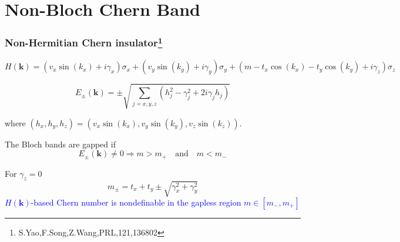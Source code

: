 \documentclass{beamer}
\begin{document}
\section{Non-Bloch Chern Band}
\begin{frame}
\frametitle{Non-Hermitian Chern insulator\footnote{S.Yao,F.Song,Z.Wang,PRL,121,136802}}
\begin{footnotesize}
\begin{equation}
H(\mathbf{k})=(v_x\sin(k_x)+i\gamma_x)\sigma_x+(v_y\sin(k_y)+i\gamma_y)\sigma_y+(m-t_x\cos(k_x)-t_y\cos(k_y)+i\gamma_z)\sigma_z
\end{equation}
\end{footnotesize}

\begin{footnotesize}
\begin{equation}
E_{\pm}(\mathbf{k})=\pm\sqrt{\sum_{j=x,y,z}(h_j^2-\gamma_j^2+2i\gamma_jh_j)}
\end{equation}
\end{footnotesize}
where $(h_x,h_y,h_z)=(v_x\sin(k_x),v_y\sin(k_y),v_z\sin(k_z))$.

The Bloch bands are gapped if $$E_{\pm}(\mathbf{k})\neq 0\Rightarrow m>m_+\quad \textrm{and}\quad m<m_{-}$$

For $\gamma_z=0$
\begin{equation}
m_{\pm}=t_x+t_y\pm\sqrt{\gamma_x^2+\gamma_y^2}
\end{equation}
\textcolor{blue}{$H(\mathbf{k})$-based Chern number is nondefinable in the gapless region $m\in\left[m_{-},m_{+}\right]$}
\end{frame}
\end{document}
